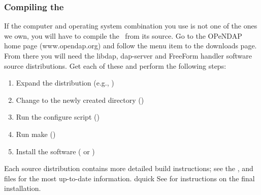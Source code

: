 \subsubsection{Compiling the \ffs}

If the computer and operating system combination you use is not one of
the ones we own, you will have to compile the \ffs\ from its source.
Go to the OPeNDAP home page (www.opendap.org) and follow the menu item
to the downloads page. From there you will need the libdap, dap-server
and FreeForm handler software source distributions. Get each of these
and perform the following steps:

\begin{enumerate}
\item Expand the distribution (e.g., )
\item Change to the newly created directory ()
\item Run the configure script ()
\item Run make ()
\item Install the software ( or )
\end{enumerate}

Each source distribution contains more detailed build instructions;
see the ,  and  files for the most
up-to-date information.
dquick
See  for instructions on the final
installation. 

